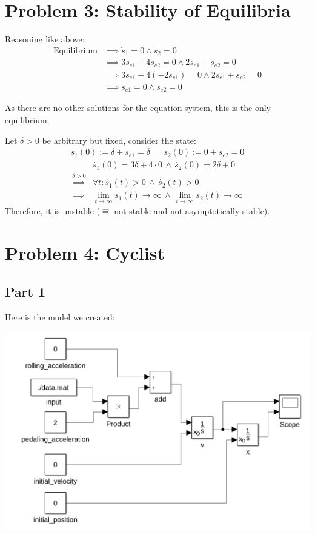 \documentclass[a4paper,parskip,headheight=38pt]{scrartcl} %
\begin{document}
\section*{Problem 3: Stability of Equilibria}

Reasoning like above:
\begin{align*}
    \text{Equilibrium}
    &\implies \dot{s}_1 = 0 \land \dot{s}_2 = 0 \\
    &\implies 3s_{e1} + 4s_{e2} = 0 \land 2s_{e1} + s_{e2} = 0 \\
    &\implies 3s_{e1} + 4(-2s_{e1}) = 0 \land 2s_{e1} + s_{e2} = 0 \\
    &\implies s_{e1} = 0 \land s_{e2} = 0
\end{align*}

As there are no other solutions for the equation system, this is the only equilibrium.

Let $\delta > 0$ be arbitrary but fixed, consider the state:
\begin{align*}
s_1(0) := \delta + s_{e1} = \delta && s_2(0) := 0 + s_{e2} = 0
\end{align*}
\begin{align*}
& \dot{s_1}(0) = 3 \delta + 4 \cdot 0 \, \land \, \dot{s_2}(0) = 2 \delta + 0 \\
\overset{\delta > 0}{\implies} & \forall t: \dot{s_1}(t) > 0 \, \land \, \dot{s_2}(t) > 0 \\
\implies & \lim_{t \to \infty} s_1(t) \to \infty \, \land \, \lim_{t \to \infty} s_2(t) \to \infty
\end{align*}
Therefore, it is unstable ($\hat{=}$ not stable and not asymptotically stable).

\section*{Problem 4: Cyclist}

\subsection*{Part 1}

Here is the model we created:

\includegraphics[width=\textwidth]{p4a-proof}
\end{document}
